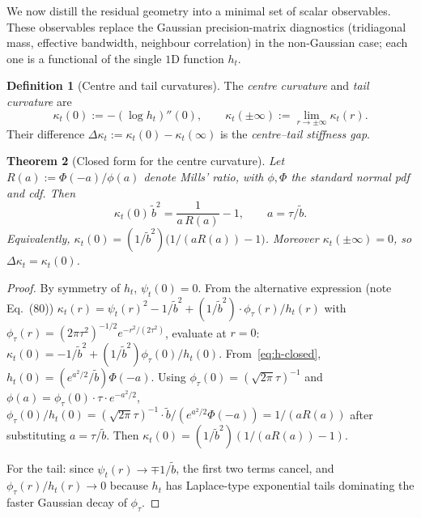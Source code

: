 \documentclass[11pt,a4paper]{article}
\theoremstyle{plainserif}
\newtheorem{theorem}{Theorem}
\theoremstyle{definition}
\newtheorem{definition}[theorem]{Definition}
\theoremstyle{remarkstyle}
\newcommand{\btilde}{\tilde{b}}
\newcommand{\mills}{R}
\begin{document}
We now distill the residual geometry into a minimal set of scalar
observables. These observables replace the Gaussian precision-matrix
diagnostics (tridiagonal mass, effective bandwidth, neighbour
correlation) in the non-Gaussian case; each one is a functional of the
single $1$D function $h_t$.

\begin{definition}[Centre and tail curvatures]
\label{def:centre-tail}
The \emph{centre curvature} and \emph{tail curvature} are
\begin{equation}
\kappa_t(0) := -(\log h_t)''(0),\qquad
\kappa_t(\pm\infty) := \lim_{r\to\pm\infty} \kappa_t(r).
\end{equation}
Their difference $\Delta\kappa_t := \kappa_t(0) - \kappa_t(\infty)$ is the
\emph{centre--tail stiffness gap}.
\end{definition}

\begin{theorem}[Closed form for the centre curvature]
\label{thm:kappa-center}
Let $\mills(a) := \Phi(-a)/\phi(a)$ denote Mills' ratio, with
$\phi,\Phi$ the standard normal pdf and cdf. Then
\begin{equation}
\boxed{\;
\kappa_t(0)\,\btilde^2 = \frac{1}{a\,\mills(a)} - 1,
\qquad a = \tau/\btilde.\;}
\label{eq:kappa-center}
\end{equation}
Equivalently, $\kappa_t(0) = (1/\btilde^2)\bigl(1/(a\mills(a)) - 1\bigr)$.
Moreover $\kappa_t(\pm\infty) = 0$, so $\Delta\kappa_t = \kappa_t(0)$.
\end{theorem}

\begin{proof}
By symmetry of $h_t$, $\psi_t(0)=0$. From the alternative expression
(note Eq.~(80))
$\kappa_t(r) = \psi_t(r)^2 - 1/\btilde^2 + (1/\btilde^2)\cdot
\phi_\tau(r)/h_t(r)$
with $\phi_\tau(r) = (2\pi\tau^2)^{-1/2} e^{-r^2/(2\tau^2)}$, evaluate at
$r=0$:
$\kappa_t(0) = -1/\btilde^2 + (1/\btilde^2)\phi_\tau(0)/h_t(0)$.
From~\eqref{eq:h-closed}, $h_t(0) = (e^{a^2/2}/\btilde)\Phi(-a)$.
Using $\phi_\tau(0) = (\sqrt{2\pi}\tau)^{-1}$ and
$\phi(a) = \phi_\tau(0)\cdot\tau\cdot e^{-a^2/2}$,
$\phi_\tau(0)/h_t(0) = (\sqrt{2\pi}\tau)^{-1}\cdot \btilde/(e^{a^2/2}\Phi(-a))
 = 1/(a\mills(a))$ after substituting $a = \tau/\btilde$. Then
$\kappa_t(0) = (1/\btilde^2)(1/(a\mills(a)) - 1)$.

For the tail: since $\psi_t(r)\to\mp 1/\btilde$, the first two terms cancel,
and $\phi_\tau(r)/h_t(r)\to 0$ because $h_t$ has Laplace-type
exponential tails dominating the faster Gaussian decay of $\phi_\tau$.
\end{proof}
\end{document}
